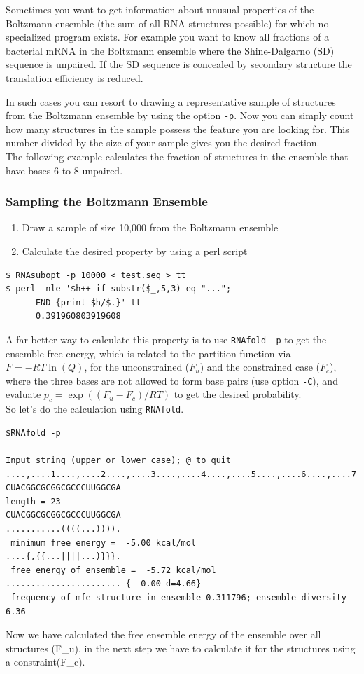 \documentclass[a4paper]{article}
\newcommand{\frametitle}[1]{\subsubsection{#1}}
\begin{document}
Sometimes you want to get information about unusual properties of the
Boltzmann ensemble (the sum of all RNA structures possible) for which no
specialized program exists. For example you want to know all fractions 
of a bacterial mRNA in the Boltzmann ensemble where the Shine-Dalgarno (SD)
 sequence is unpaired. If the SD sequence is concealed 
by secondary structure the translation efficiency is reduced.

In such cases you can resort to drawing a representative sample of
structures from the Boltzmann ensemble by using the option
\texttt{-p}. Now you can simply count how many structures in the sample
possess the feature you are looking for. This number divided by the
size of your sample gives you the desired fraction.\\

\noindent
The following example calculates the fraction of structures in the
ensemble that have bases 6 to 8 unpaired.

\frametitle{Sampling the Boltzmann Ensemble}
\begin{enumerate}
\item Draw a sample of size 10,000 from the Boltzmann ensemble
\item Calculate the desired property by using a perl script
\end{enumerate}
\begin{verbatim}
$ RNAsubopt -p 10000 < test.seq > tt
$ perl -nle '$h++ if substr($_,5,3) eq "...";
      END {print $h/$.}' tt
      0.391960803919608
\end{verbatim}

\noindent
A far better way to calculate this property is to use \texttt{RNAfold -p} 
to get the ensemble free energy, which is related to the
partition function via $F = -RT\ln(Q)$, for the unconstrained ($F_u$)
and the constrained case ($F_c$), where the three bases are not
allowed to form base pairs (use option \texttt{-C}), and evaluate $p_c
= \exp((F_u - F_c)/RT)$ to get the desired probability.\\

So let's do the calculation using \texttt{RNAfold}.
\begin{verbatim}
$RNAfold -p

Input string (upper or lower case); @ to quit
....,....1....,....2....,....3....,....4....,....5....,....6....,....7....,....8
CUACGGCGCGGCGCCCUUGGCGA
length = 23
CUACGGCGCGGCGCCCUUGGCGA
...........((((...)))).
 minimum free energy =  -5.00 kcal/mol
....{,{{...||||...)}}}.
 free energy of ensemble =  -5.72 kcal/mol
....................... {  0.00 d=4.66}
 frequency of mfe structure in ensemble 0.311796; ensemble diversity 6.36  
\end{verbatim}
\noindent 
Now we have calculated the free ensemble energy of the ensemble over all structures (F\_u), 
in the next step we have to calculate it for the structures using a constraint(F\_c).\\
\end{document}
